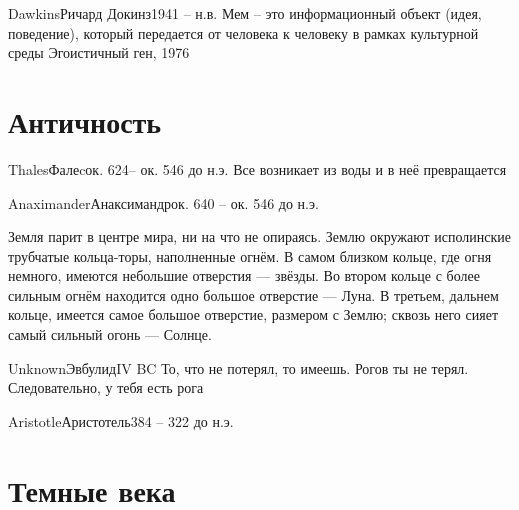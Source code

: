 \documentclass[aspectratio=169]{beamer}
\begin{document}
\begin{Person}{Dawkins}{Ричард Докинз}{1941 -- н.в.}
\Citation
{
Мем -- это информационный объект (идея, поведение), который передается от человека к человеку в рамках культурной среды
}
{
Эгоистичный ген, 1976
}
\end{Person}

\section{Античность}

\begin{Person}{Thales}{Фалеc}{ок. 624-- ок. 546 до н.э.}
Все возникает из воды и в неё превращается
\end{Person}

\begin{Person}{Anaximander}{Анаксимандр}{ок. 640 -- ок. 546 до н.э.}

Земля парит в центре мира, ни на что не опираясь. Землю окружают исполинские трубчатые кольца-торы, наполненные огнём. В самом близком кольце, где огня немного, имеются небольшие отверстия — звёзды. Во втором кольце с более сильным огнём находится одно большое отверстие — Луна. В третьем, дальнем кольце, имеется самое большое отверстие, размером с Землю; сквозь него сияет самый сильный огонь — Солнце.
\end{Person}

\begin{Person}{Unknown}{Эвбулид}{IV BC}
То, что не потерял, то имеешь. Рогов ты не терял. Следовательно, у тебя есть рога
\end{Person}

\renewcommand{\ReasonWidth}{5cm}
\begin{Person}{Aristotle}{Аристотель}{384 -- 322 до н.э.}
\end{Person}


\section{Темные века}


\begin{frame}[plain]
\begin{center}
\end{center}
\end{frame}
\end{document}
